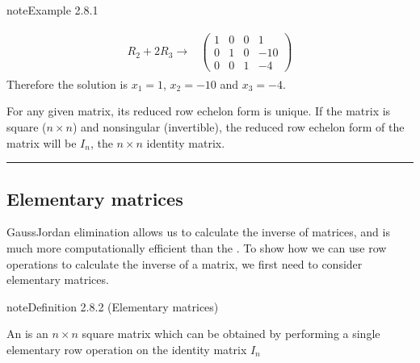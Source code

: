 \documentclass[letterpaper,10pt,english]{jupyterBook}
\begin{document}
\begin{sphinxadmonition}{note}{Example 2.8.1}
\begin{equation*}
\begin{split}
\begin{align*}
    \\ \\
     R_2 + 2R_3 \longrightarrow
    & \left( \begin{array}{ccc|c}
        1 & 0 & 0 & 1 \\
        0 & 1 & 0 & -10 \\
        0 & 0 & 1 & -4
    \end{array} \right)
\end{align*} \end{split}
\end{equation*}
\sphinxAtStartPar
Therefore the solution is \(x_1 = 1\), \(x_2 = -10\) and \(x_3 = -4\).
\end{sphinxadmonition}

\sphinxAtStartPar
For any given matrix, its reduced row echelon form is unique. If the matrix is square (\(n \times n\)) and non\sphinxhyphen{}singular (invertible), the reduced row echelon form of the matrix will be \(I_n\), the \(n \times n\) identity matrix.


\bigskip\hrule\bigskip


\ignorespaces 

\subsection{Elementary matrices}
\label{\detokenize{_pages/2.5_Gauss_Jordan_elimination:elementary-matrices}}\label{\detokenize{_pages/2.5_Gauss_Jordan_elimination:index-4}}
\sphinxAtStartPar
Gauss\sphinxhyphen{}Jordan elimination allows us to calculate the inverse of matrices, and is much more computationally efficient than the {\hyperref[\detokenize{_pages/1.5_Inverse_matrix:adjoint-definition}]{}}. To show how we can use row operations to calculate the inverse of a matrix, we first need to consider elementary matrices.
\label{_pages/2.5_Gauss_Jordan_elimination:elementary-matrices-definition}
\begin{sphinxadmonition}{note}{Definition 2.8.2 (Elementary matrices)}



\sphinxAtStartPar
An  is an \(n \times n\) square matrix which can be obtained by performing a single elementary row operation on the identity matrix \(I_n\)
\end{sphinxadmonition}
\end{document}
